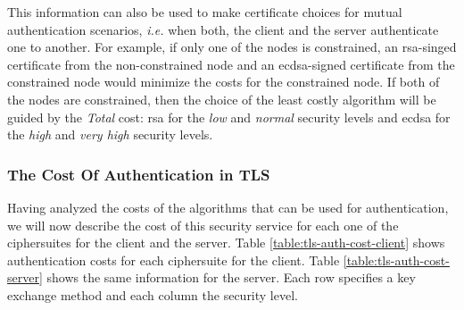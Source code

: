 \documentclass{llncs}
\begin{document}
This information can also be used to make
certificate choices for mutual authentication scenarios, \textit{i.e.} when both, the client and the server authenticate one to another.
For example, if only one of the nodes is constrained, an \gls{rsa}-singed certificate from the non-constrained node and an \gls{ecdsa}-signed
certificate from the constrained node would minimize the costs for the constrained node. If both of the nodes are constrained, then the
choice of the least costly algorithm will be guided by the \textit{Total} cost: \gls{rsa} for the \textit{low} and \textit{normal}
security levels and \gls{ecdsa} for the \textit{high} and \textit{very high} security levels.

\subsubsection{The Cost Of Authentication in TLS} \label{sec:auth-cost-in-tls}

Having analyzed the costs of the algorithms that can be used for authentication, we will now describe the cost of this security service
for each one of the ciphersuites for the client and the server. Table \ref{table:tls-auth-cost-client} shows authentication costs for each
ciphersuite for the client. Table \ref{table:tls-auth-cost-server} shows the same information for the server. Each row specifies a key
exchange method and each column the security level.
\end{document}
